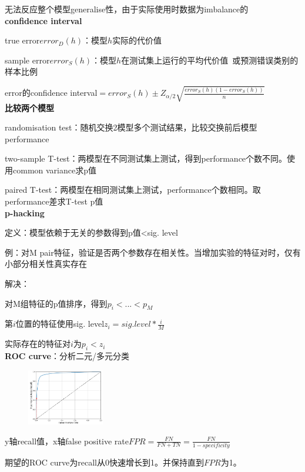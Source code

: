 \documentclass[UTF8]{ctexart}
\begin{document}
  \quad 无法反应整个模型generalise性，由于实际使用时数据为imbalance的\\
\textbf{confidence interval}

  true error$error_D(h)$：模型$h$实际的代价值

  sample error$error_S(h)$：模型$h$在测试集上运行的平均代价值\ 或预测错误类别的样本比例

  error的confidence interval$= error_S(h) \pm Z_{\alpha/2}\sqrt{\frac{error_S(h)(1-error_S(h))}{n}}$\\
\textbf{比较两个模型}

  randomisation test：随机交换2模型多个测试结果，比较交换前后模型performance

  two-sample T-test：两模型在不同测试集上测试，得到performance个数不同。使用common variance求p值

  paired T-test：两模型在相同测试集上测试，performance个数相同。取performance差求T-test p值\\
\textbf{p-hacking}

  定义：模型依赖于无关的参数得到p值<sig. level

  \quad 例：对M pair特征，验证是否两个参数存在相关性。当增加实验的特征对时，仅有小部分相关性真实存在

  解决：
  
  \quad 对M组特征的p值排序，得到$p_i < ...< p_M$

  \quad 第$i$位置的特征使用sig. level$z_i = sig. level * \frac{i}{M}$ 

  \quad 实际存在的特征对$i$为$p_i < z_i$\\
\textbf{ROC curve}：分析二元/多元分类

  \begin{figure}[H] %
    \centering %
    \includegraphics[width=0.3\textwidth]{note_images/ROC_curve.png} %
  \end{figure}

  y轴recall值，x轴false positive rate$FPR = \frac{FN}{FN + TN} = \frac{FN}{1-specificity}$

  期望的ROC curve为recall从0快速增长到1。并保持直到$FPR$为1。
  
\end{document}
